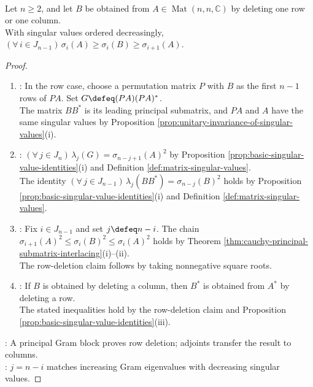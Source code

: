 \begin{corollary} \label{cor:singular-values-interlace-after-deleting-row-or-column} \\
Let $n\geq2$, and let $B$ be obtained from $A\in\operatorname{Mat}(n,n,\mathbb{C})$ by deleting one row or one column.\\
With singular values ordered decreasingly, $(\forall\,i\in J_{n-1})\,\sigma_i(A)\geq\sigma_i(B)\geq\sigma_{i+1}(A)$.
\begin{proof}
\begin{enumerate}[label=(\roman*)]
\setlength{\itemsep}{0pt}
\item {}: In the row case, choose a permutation matrix $P$ with $B$ as the first $n-1$ rows of $PA$. Set $G\defeq(PA)(PA)^*$.\\
The matrix $BB^*$ is its leading principal submatrix, and $PA$ and $A$ have the same singular values by Proposition \ref{prop:unitary-invariance-of-singular-values}(i).
\item {}: $(\forall\,j\in J_n)\,\lambda_j(G)=\sigma_{n-j+1}(A)^2$ by Proposition \ref{prop:basic-singular-value-identities}(i) and Definition \ref{def:matrix-singular-values}.\\
The identity $(\forall\,j\in J_{n-1})\,\lambda_j(BB^*)=\sigma_{n-j}(B)^2$ holds by Proposition \ref{prop:basic-singular-value-identities}(i) and Definition \ref{def:matrix-singular-values}.
\item {}: Fix $i\in J_{n-1}$ and set $j\defeq n-i$. The chain $\sigma_{i+1}(A)^2\leq\sigma_i(B)^2\leq\sigma_i(A)^2$ holds by Theorem \ref{thm:cauchy-principal-submatrix-interlacing}(i)--(ii).\\
The row-deletion claim follows by taking nonnegative square roots.
\item {}: If $B$ is obtained by deleting a column, then $B^*$ is obtained from $A^*$ by deleting a row.\\
The stated inequalities hold by the row-deletion claim and Proposition \ref{prop:basic-singular-value-identities}(iii).
\end{enumerate}
: A principal Gram block proves row deletion; adjoints transfer the result to columns.\\
: $j=n-i$ matches increasing Gram eigenvalues with decreasing singular values.
\end{proof}
\end{corollary}


